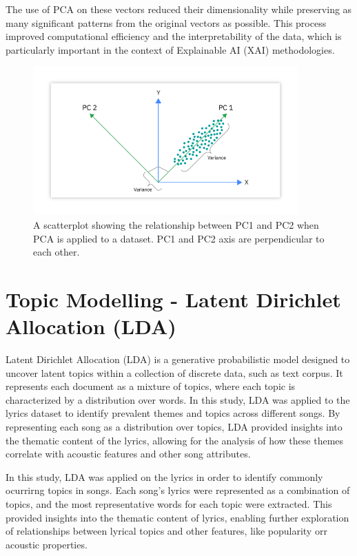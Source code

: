 The use of PCA on these vectors reduced their dimensionality while preserving
as many significant patterns from the original vectors as possible. This
process improved computational efficiency and the interpretability of the data,
which is particularly important in the context of Explainable AI (XAI)
methodologies.

\begin{center}
\begin{figure}[ht]
  \centering
  \includegraphics[width=4in]{img/pca.png}
  \caption{A scatterplot showing the relationship between PC1 and PC2 when PCA
  is applied to a dataset. PC1 and PC2 axis are perpendicular to each other.\cite{pca}}
  \label{Figure:fig_beh}
\end{figure}
\end{center}


\section{Topic Modelling - Latent Dirichlet Allocation (LDA)}
\label{sec:topicmodelling}

Latent Dirichlet Allocation (LDA)\cite{lda} is a generative probabilistic model
designed to uncover latent topics within a collection of discrete data, such as
text corpus.  It represents each document as a mixture of topics, where each
topic is characterized by a distribution over words. In this study, LDA was
applied to the lyrics dataset to identify prevalent themes and topics across
different songs. By representing each song as a distribution over topics, LDA
provided insights into the thematic content of the lyrics, allowing for the
analysis of how these themes correlate with acoustic features and other song
attributes.

In this study, LDA was applied on the lyrics in order to identify commonly
ocurrirng topics in songs. Each song's lyrics were represented as a combination
of topics, and the most representative words for each topic were extracted.
This provided insights into the thematic content of lyrics, enabling further
exploration of relationships between lyrical topics and other features, like
popularity orr acoustic properties.

